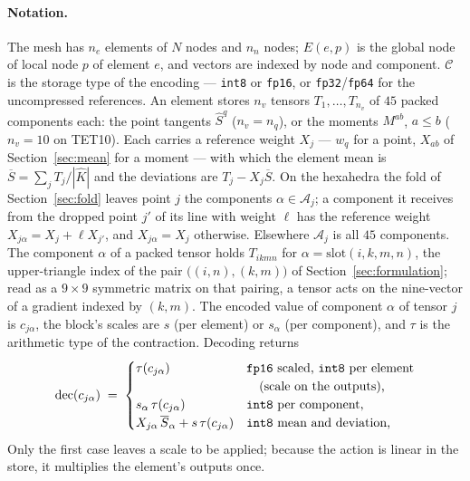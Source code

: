 \documentclass[sigconf,balance=false]{acmart}
\newcommand{\refcell}{\widehat{K}}
\newcommand{\Sq}{\widehat{S}^{q}}
\newcommand{\Sbar}{\overline{S}}
\newcommand{\Mab}{M^{ab}}
\begin{document}
\paragraph{Notation.}  The mesh has $n_e$ elements of $N$ nodes and $n_n$ nodes; $E(e,p)$ is
the global node of local node $p$ of element $e$, and vectors are indexed by node and component.
$\mathcal{C}$ is the storage type of the encoding --- \texttt{int8} or \texttt{fp16}, or
\texttt{fp32}/\texttt{fp64} for the uncompressed references.  An element stores $n_v$ tensors $T_1,\dots,T_{n_v}$ of $45$ packed
components each: the point tangents $\Sq$ ($n_v=n_q$), or the moments $\Mab$, $a\le b$
($n_v=10$ on TET10).  Each carries a reference weight $X_j$ --- $w_q$ for a point, $X_{ab}$ of
Section~\ref{sec:mean} for a moment --- with which the element mean is
$\Sbar = \sum_j T_j/|\refcell|$ and the deviations are $T_j - X_j\Sbar$.  On the hexahedra the
fold of Section~\ref{sec:fold} leaves point $j$ the components $\alpha\in\mathcal{A}_j$; a
component it receives from the dropped point $j'$ of its line with weight $\ell$ has the reference
weight $X_{j\alpha}=X_j+\ell X_{j'}$, and $X_{j\alpha}=X_j$ otherwise.  Elsewhere $\mathcal{A}_j$ is
all $45$ components.  The component $\alpha$ of
a packed tensor holds $T_{ikmn}$ for $\alpha=\mathrm{slot}(i,k,m,n)$, the upper-triangle index of
the pair $\bigl((i,n),(k,m)\bigr)$ of Section~\ref{sec:formulation}; read as a $9\times9$
symmetric matrix on that pairing, a tensor acts on the nine-vector of a gradient indexed by
$(k,m)$.  The encoded value of
component $\alpha$ of tensor $j$ is $c_{j\alpha}$, the block's scales are $s$ (per element) or
$s_\alpha$ (per component), and $\tau$ is the arithmetic type of the contraction.  Decoding returns
\begin{equation}
  \mathrm{dec}(c_{j\alpha}) \;=\;
  \begin{cases}
    \tau(c_{j\alpha}) & \text{\texttt{fp16} scaled, \texttt{int8} per element}\\
                      & \text{\quad (scale on the outputs),}\\
    s_\alpha\,\tau(c_{j\alpha}) & \text{\texttt{int8} per component,}\\
    X_{j\alpha}\,\Sbar_\alpha + s\,\tau(c_{j\alpha}) & \text{\texttt{int8} mean and deviation,}
  \end{cases}
  \label{eq:decode}
\end{equation}
Only the first case leaves a scale to be applied;
because the action is linear in the store, it multiplies the element's outputs once.
\end{document}

